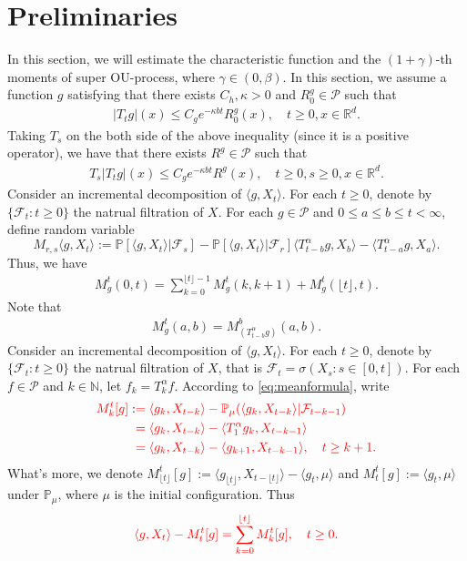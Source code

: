 \documentclass[12pt,oneside,english]{amsart}
\theoremstyle{plain}
\theoremstyle{definition}
\numberwithin{equation}{section}
\newcommand{\added}[1]{{\color{blue}#1}}\newcommand{\deleted}[1]{{\color{red}#1}}
\begin{document}
\section{Preliminaries}
    In this section, we will estimate the characteristic function and the $(1+\gamma)$-th moments of super OU-process, where $\gamma \in (0,\beta)$.
    \deleted{In this section, we assume a function $g$ satisfying that there exists $C_h, \kappa>0$ and $R^g_0\in \mathcal{P}$
    such that}
\deleted{\begin{align}\label{eq:gcontrol1}
    |T_tg|(x)
    \leq C_g e^{-\kappa bt}R^g_0(x),
    \quad t\geq 0,x\in \mathbb{R}^d.
\end{align}}
\deleted{Taking $T_s$ on the both side of the above inequality (since it is a positive operator), we have that there exists $R^g \in \mathcal P$ such that}
\deleted{\begin{align}\label{eq:gcontrol}
    T_s|T_t g|(x)
    \leq C_g e^{-\kappa bt} R^g(x),
    \quad t\geq 0,s\geq 0,x\in \mathbb{R}^d.
\end{align}}
\added{
    Consider an incremental decomposition of $\langle g,X_t \rangle$.
    For each $t\geq 0$, denote by $\{\mathcal{F}_t:t\geq 0\}$ the natrual filtration of $X$.
    For each $g\in \mathcal P$ and $0 \leq a \leq b \leq t <\infty$, define random variable
\[
    M_{r,s}\langle g,X_t\rangle
    := \mathbb P[\langle g,X_t\rangle|\mathscr F_s] - \mathbb P[\langle g,X_t\rangle|\mathscr F_r]
    \langle T_{t-b}^\alpha g, X_b\rangle - \langle T_{t-a}^\alpha g, X_a\rangle.
\]
    Thus, we have
\begin{align}
    M^t_g(0,t)
    = \sum_{k = 0}^{\lfloor t \rfloor - 1} M^t_g(k,k+1) + M^t_g(\lfloor t \rfloor, t).
\end{align}
    Note that
\begin{align}
    M_g^t(a,b) = M_{(T_{t-b}^\alpha g)}^b (a,b).
\end{align}
}
\deleted{
    Consider an incremental decomposition of $\langle g,X_t \rangle$.
    For each $t\geq 0$, denote by $\{\mathcal{F}_t:t\geq 0\}$ the natrual filtration of $X$, that is $\mathcal{F}_t=\sigma(X_s:s\in [0,t])$.
    For each $f\in\mathcal{P}$ and $k \in \mathbb{N}$, let $f_k=T^{\alpha}_k f$.
    According to \eqref{eq:meanformula}, write}
\begin{align*}
    \deleted{M_k^t[g]}:&
    \deleted{=\langle g_k, X_{t-k}\rangle-\mathbb{P}_{\mu}(\langle g_k,X_{t-k}\rangle|\mathcal{F}_{t-k-1})}\\
    &\deleted{=\langle g_k, X_{t-k}\rangle-\langle T_1^{\alpha}g_{k},X_{t-k-1}\rangle}\\
    &\deleted{=\langle g_k, X_{t-k}\rangle-\langle g_{k+1},X_{t-k-1}\rangle, \quad t\geq k+1.}
\end{align*}
    \deleted{What's more, we denote $M_{\lfloor t\rfloor}^t[g]:=\langle g_{\lfloor t \rfloor},X_{t-\lfloor t\rfloor}\rangle-\langle g_t, \mu\rangle$ and $M_t^t[g]:=\langle g_t,\mu\rangle$ under $\mathbb P_\mu$, where $\mu $ is the initial configuration. Thus}
\begin{equation}\label{decomposition}
    \deleted{\langle g,X_t\rangle-M_t^t[g]
    =\sum_{k=0}^{\lfloor t\rfloor}M_k^t[g]
    , \quad t \geq 0.}
\end{equation}
\end{document}
